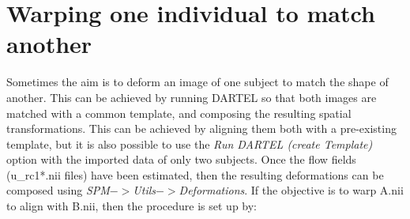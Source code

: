 \section{Warping one individual to match another}
Sometimes the aim is to deform an image of one subject to match the shape of another.
This can be achieved by running DARTEL so that both images are matched with a common template, and composing the resulting spatial transformations.
This can be achieved by aligning them both with a pre-existing template, but it is also possible to use the \emph{Run DARTEL (create Template)} option with the imported data of only two subjects.
Once the flow fields (u\_rc1*.nii files) have been estimated, then the resulting deformations can be composed using \emph{SPM$->$Utils$->$Deformations}.
If the objective is to warp A.nii to align with B.nii, then the procedure is set up by:
